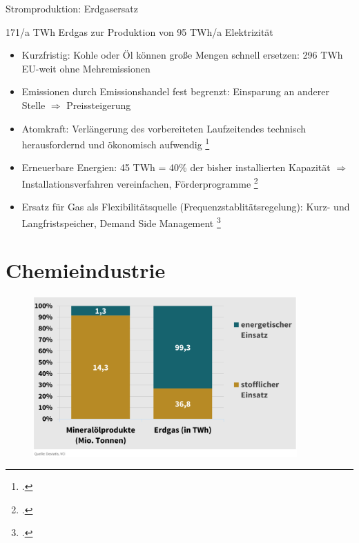 \documentclass[10pt]{beamer}
\begin{document}
\begin{frame}{Stromproduktion: Erdgasersatz}
  \small{
  171/a TWh Erdgas zur Produktion von 95 TWh/a Elektrizität

  \begin{itemize}
    \item Kurzfristig: Kohle oder Öl können große Mengen schnell ersetzen: 
      296 TWh EU-weit ohne Mehremissionen 
    \item Emissionen durch Emissionshandel fest begrenzt: 
      Einsparung an anderer Stelle $\Rightarrow$ Preissteigerung 
    \item Atomkraft: Verlängerung des vorbereiteten Laufzeitendes 
      technisch herausfordernd und ökonomisch aufwendig \footcite{leo}
    \item Erneuerbare Energien: 
      45 TWh = 40\% der bisher installierten Kapazität 
      $\Rightarrow$ Installationsverfahren vereinfachen, Förderprogramme \footcite{leo}
    \item Ersatz für Gas als Flexibilitätsquelle (Frequenzstablitätsregelung):
      Kurz- und Langfristspeicher, Demand Side Management \footcite{iea2022}
  \end{itemize}
  }
\end{frame}

\section{Chemieindustrie}

\begin{frame}
\begin{figure}
\includegraphics[width=0.9\textwidth]{fig/anteile_chemieindustrie.png}

\scriptsize{}
\end{figure}
\end{frame}
\end{document}
